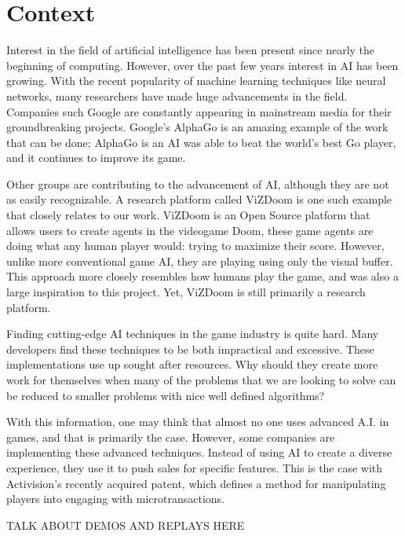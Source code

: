 


\section{Context}

Interest in the field of artificial intelligence has been present since nearly the beginning of computing. However, over the past few years interest in AI has been growing. With the recent popularity of machine learning techniques like neural networks, many researchers have made huge advancements in the field. Companies such Google are constantly appearing in mainstream media for their groundbreaking projects. Google's AlphaGo is an amazing example of the work that can be done; AlphaGo is an AI was able to beat the world's best Go player, and it continues to improve its game.

Other groups are contributing to the advancement of AI, although they are not as easily recognizable. A research platform called ViZDoom is one such example that closely relates to our work. ViZDoom is an Open Source platform that allows users to create agents in the videogame Doom, these game agents are doing what any human player would: trying to maximize their score. However, unlike more conventional game AI, they are playing using only the visual buffer. This approach more closely resembles how humans play the game, and was also a large inspiration to this project. Yet, ViZDoom is still primarily a research platform.

Finding cutting-edge AI techniques in the game industry is quite hard. Many developers find these techniques to be both impractical and excessive. These implementations use up sought after resources. Why should they create more work for themselves when many of the problems that we are looking to solve can be reduced to smaller problems with nice well defined algorithms?

With this information, one may think that almost no one uses advanced A.I. in games, and that is primarily the case. However, some companies are implementing these advanced techniques. Instead of using AI to create a diverse experience, they use it to push sales for specific features. This is the case with Activision's recently acquired patent, which defines a method for manipulating players into engaging with microtransactions.

TALK ABOUT DEMOS AND REPLAYS HERE

